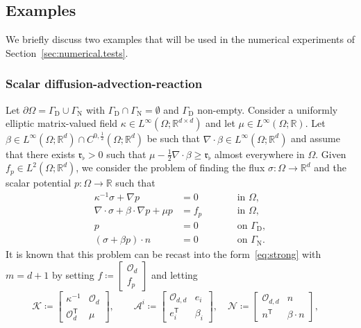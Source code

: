\documentclass[11pt,a4paper]{article}
\theoremstyle{plain}
\theoremstyle{remark}
\theoremstyle{definition}
\newcommand{\Real}{\mathbb{R}}
\newcommand{\trans}{\mathsf{T}}
\newcommand{\dirichlet}{\mathrm{D}}
\newcommand{\neumann}{\mathrm{N}}
\newcommand{\Kmin}{\mathfrak{r}_\flat}
\begin{document}
\subsection{Examples}

We briefly discuss two examples that will be used in the numerical experiments of Section~\ref{sec:numerical.tests}.

\subsubsection{Scalar diffusion-advection-reaction}\label{subsubsec:scalar-dar}

Let $\partial\Omega=\Gamma_\dirichlet\cup\Gamma_\neumann$ with $\Gamma_\dirichlet\cap\Gamma_\neumann=\emptyset$ and $\Gamma_\dirichlet$ non-empty.
Consider a uniformly elliptic matrix-valued field $\kappa \in L^\infty(\Omega;\Real^{d\times d})$ and let $\mu \in L^\infty(\Omega;\Real)$.
Let $\beta \in L^\infty(\Omega;\Real^d) \cap C^{0,\frac12}(\Omega;\Real^d)$ be such that $\nabla\cdot\beta\in L^\infty(\Omega;\Real^d)$ and
assume that there exists $\Kmin>0$ such that $\mu -\frac12 \nabla\cdot\beta \ge \Kmin$ almost everywhere in $\Omega$.
Given $f_p \in L^2(\Omega;\Real^d)$, we consider the problem of finding the flux $\sigma:\Omega \to \Real^d$ and the scalar potential $p : \Omega \to \Real$ such that
\begin{equation}\label{eq:scalar_DAR}
  \begin{aligned}
    \kappa^{-1} \sigma + \nabla p &= 0 &\qquad& \text{in $\Omega$},
    \\
    \nabla \cdot \sigma + \beta\cdot\nabla p + \mu p &= f_p &\qquad& \text{in $\Omega$},
    \\
    p &= 0 &\qquad& \text{on $\Gamma_\dirichlet$},
    \\
    (\sigma + \beta p) \cdot n &= 0 &\qquad& \text{on $\Gamma_\neumann$}.
  \end{aligned}
\end{equation}
It is known that this problem can be recast into the form~\eqref{eq:strong} with $m = d + 1$ by setting $f \coloneqq
\begin{bmatrix}
  \mathcal{O}_d\\
  f_p
\end{bmatrix}$ and letting
\[
\mathcal{K} \coloneqq \begin{bmatrix}
  \kappa^{-1} & \mathcal{O}_{d} \\
  \mathcal{O}_{d}^\trans & \mu
\end{bmatrix},\qquad
\mathcal{A}^i \coloneqq \begin{bmatrix}
  \mathcal{O}_{d,d} & e_i \\
  e_i^\trans & \beta_i
\end{bmatrix},
\quad
\mathcal{N} \coloneqq \begin{bmatrix}
  \mathcal{O}_{d,d} & n \\
  n^\trans & \beta\cdot n
\end{bmatrix},
\quad
\]
\end{document}
